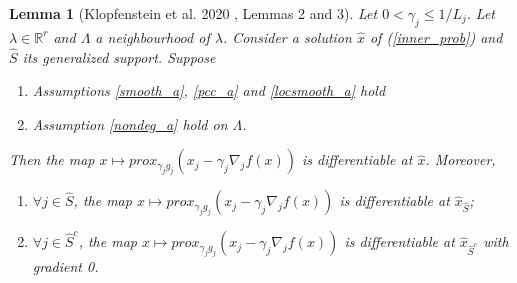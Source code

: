 \documentclass[11pt, twoside]{report}
\newtheorem{lemma}[theorem]{Lemma}
\begin{document}
\begin{lemma}[Klopfenstein et al. 2020 \cite{klopfenstein2020model}, Lemmas 2 and 3]
\label{diffprox_l}
Let $0 < \gamma_j \leq 1/L_j.$ Let $\lambda \in \mathbb{R}^r$ and $\Lambda$ a neighbourhood of $\lambda$. Consider a solution $\hat{x}$ of (\ref{inner_prob}) and $\hat{S}$ its generalized support. Suppose
\begin{enumerate}
    \item Assumptions \ref{smooth_a}, \ref{pcc_a} and \ref{locsmooth_a} hold
    \item Assumption \ref{nondeg_a} hold on $\Lambda$.
\end{enumerate}
Then the map $x \mapsto prox_{\gamma_j g_j}(x_j - \gamma_j \nabla_j f(x))$ is differentiable at $\hat{x}$. Moreover,
\begin{enumerate}
    \item $\forall j \in \hat{S}$, the map $x \mapsto prox_{\gamma_j g_j}(x_j - \gamma_j \nabla_j f(x))$ is differentiable at $\hat{x}_{\hat{S}}$;
    \item $\forall j \in \hat{S}^c $, the map $x \mapsto prox_{\gamma_j g_j}(x_j - \gamma_j \nabla_j f(x))$ is differentiable at $\hat{x}_{\hat{S}^c}$ with gradient 0.
\end{enumerate}

\end{lemma}
\end{document}
